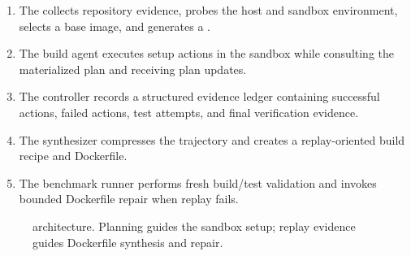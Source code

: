 \begin{enumerate}[leftmargin=*]
  \item The \planner collects repository evidence, probes the host and sandbox environment, selects a base image, and generates a \ttg.
  \item The build agent executes setup actions in the sandbox while consulting the materialized plan and receiving plan updates.
  \item The controller records a structured evidence ledger containing successful actions, failed actions, test attempts, and final verification evidence.
  \item The synthesizer compresses the trajectory and creates a replay-oriented build recipe and Dockerfile.
  \item The benchmark runner performs fresh build/test validation and invokes bounded Dockerfile repair when replay fails.
\end{enumerate}

\begin{figure}[t]
\centering
{}
\caption{\tool architecture. Planning guides the sandbox setup; replay evidence guides Dockerfile synthesis and repair.}
\label{fig:architecture}
\end{figure}

